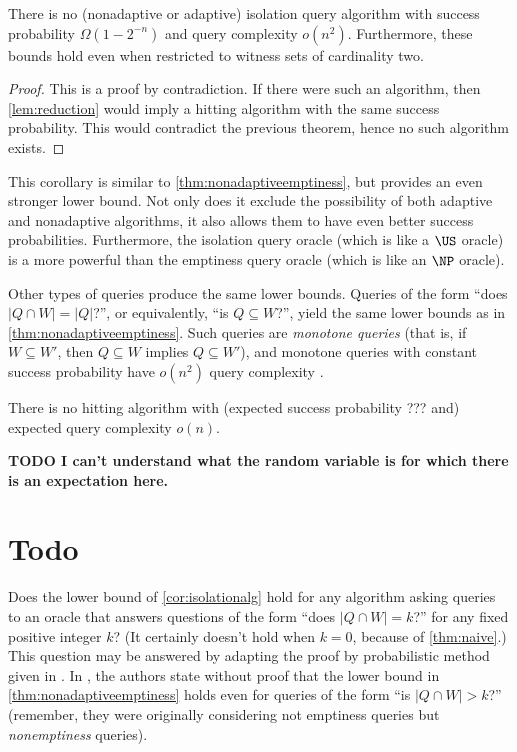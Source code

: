 \documentclass{article}
\newcommand{\todo}[1]{\textbf{TODO #1}}
\begin{document}
\begin{corollary}\label{cor:isolationalg}
  There is no (nonadaptive or adaptive) isolation query algorithm with success probability $\Omega(1 - 2^{-n})$ and query complexity $o(n^2)$.
  Furthermore, these bounds hold even when restricted to witness sets of cardinality two.
\end{corollary}
\begin{proof}
  This is a proof by contradiction.
  If there were such an algorithm, then \autoref{lem:reduction} would imply a hitting algorithm with the same success probability.
  This would contradict the previous theorem, hence no such algorithm exists.
\end{proof}

This corollary is similar to \autoref{thm:nonadaptiveemptiness}, but provides an even stronger lower bound.
Not only does it exclude the possibility of both adaptive and nonadaptive algorithms, it also allows them to have even better success probabilities.
Furthermore, the isolation query oracle (which is like a $\US$ oracle) is a more powerful than the emptiness query oracle (which is like an $\NP$ oracle).

Other types of queries produce the same lower bounds.
Queries of the form ``does $|Q \cap W| = |Q|$?'', or equivalently, ``is $Q \subseteq W$?'', yield the same lower bounds as in \autoref{thm:nonadaptiveemptiness}.
Such queries are \emph{monotone queries} (that is, if $W \subseteq W'$, then $Q \subseteq W$ implies $Q \subseteq W'$), and monotone queries with constant success probability have $o(n^2)$ query complexity \autocite[Theorem~1.3]{krw14}.

\begin{theorem}
  There is no hitting algorithm with (expected success probability ??? and) expected query complexity $o(n)$.
\end{theorem}

\todo{I can't understand what the random variable is for which there is an expectation here.}

\section{Todo}

Does the lower bound of \autoref{cor:isolationalg} hold for any algorithm asking queries to an oracle that answers questions of the form ``does $|Q \cap W| = k$?'' for any fixed positive integer $k$?
(It certainly doesn't hold when $k = 0$, because of \autoref{thm:naive}.)
This question may be answered by adapting the proof by probabilistic method given in \autocite{ablp91}.
In \autocite[Remark~2]{krw12}, the authors state without proof that the lower bound in \autoref{thm:nonadaptiveemptiness} holds even for queries of the form ``is $|Q \cap W| > k$?'' (remember, they were originally considering not emptiness queries but \emph{nonemptiness} queries).

\printbibliography{}
\end{document}

